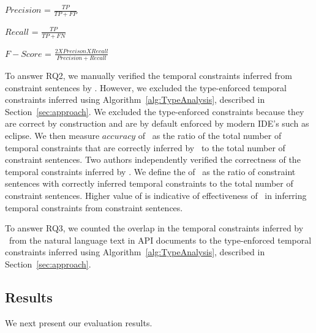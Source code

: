 \begin{center}

$Precision$ = $\frac{TP}{TP + FP}$

$Recall$ = $\frac{TP}{TP + FN}$

$F-Score$ = $\frac{2 X Precison X Recall}{Precision + Recall}$
\end{center}


To answer RQ2, we manually verified the temporal constraints inferred from constraint sentences by \tool.
However, we excluded the type-enforced temporal constraints inferred using Algorithm~\ref{alg:TypeAnalysis}, described in Section~\ref{sec:approach}.
We excluded the type-enforced constraints because they are correct by construction and are by default enforced by modern IDE's such as eclipse. 
We then measure $accuracy$ of \tool\ as the ratio of the total number of temporal constraints that
are correctly inferred by \tool\ to the total number of constraint sentences. Two authors
independently verified the correctness of the temporal constraints inferred by \tool.
We define the  of \tool\ as the ratio of constraint sentences with correctly inferred temporal constraints
to the total number of constraint sentences. 
Higher value of  is indicative of effectiveness of \tool\ in inferring temporal constraints from constraint sentences.


To answer RQ3, we counted the overlap in the temporal constraints inferred by \tool\ 
from the natural language text in API documents to the type-enforced temporal constraints
inferred using Algorithm~\ref{alg:TypeAnalysis}, described in Section~\ref{sec:approach}.

\subsection{Results}

We next present our evaluation results.

